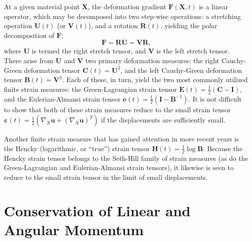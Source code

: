 At a given material point $\mathbf{X}$, the deformation gradient $\mathbf{F} (\mathbf{X}, t)$ is a linear operator, which may be decomposed into two step-wise operations: a stretching operation $\mathbf{U}(t)$ (or $\mathbf{V}(t)$), and a rotation $\mathbf{R}(t)$, yielding the polar decomposition of $\mathbf{F}$:
\begin{equation}
  \mathbf{F} = \mathbf{R} \mathbf{U} = \mathbf{V} \mathbf{R},
\end{equation}
where $\mathbf{U}$ is termed the right stretch tensor, and $\mathbf{V}$ is the left stretch tensor. There arise from $\mathbf{U}$ and $\mathbf{V}$ two primary deformation measures: the right Cauchy-Green deformation tensor $\mathbf{C}(t) = \mathbf{U}^2$, and the left Cauchy-Green deformation tensor $\mathbf{B}(t) = \mathbf{V}^2$. Each of these, in turn, yield the two most commonly utilized finite strain measures: the Green-Lagrangian strain tensor $\mathbf{E}(t) = \frac{1}{2} (\mathbf{C} - \mathbf{I})$, and the Eulerian-Almansi strain tensor $\mathbf{e}(t) = \frac{1}{2} (\mathbf{I} - \mathbf{B}^{-1})$. It is not difficult to show that both of these strain measures reduce to the small strain tensor $\boldsymbol{\varepsilon}(t) = \frac{1}{2} (\nabla_X \mathbf{u} + (\nabla_X \mathbf{u})^T)$ if the displacements are sufficiently small.

Another finite strain measure that has gained attention in more recent years is the Hencky (logarithmic, or ``true'') strain tensor $\mathbf{H}(t) = \frac{1}{2} \log \mathbf{B}$. Because the Hencky strain tensor belongs to the Seth-Hill family of strain measures (as do the Green-Lagrangian and Eulerian-Almansi strain tensors), it likewise is seen to reduce to the small strain tensor in the limit of small displacements.

\section{Conservation of Linear and Angular Momentum}

